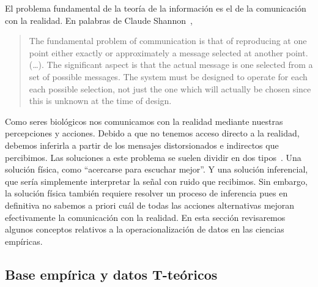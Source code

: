 \documentclass[a4paper,11pt]{book}
\theoremstyle{definition}
\begin{document}
El problema fundamental de la teor\'ia de la informaci\'on es el de la comunicaci\'on con la realidad.
%
En palabras de Claude Shannon~\cite{shannon1948-theoryOfCommunication},
%
\begin{quotation}
The fundamental problem of communication is that of reproducing at one point either exactly or approximately a message selected at another point.
(\dots).
The significant aspect is that the actual message is one selected from a set of possible messages.
The system must be designed to operate for each each possible selection, not just the one which will actually be chosen since this is unknown at the time of design.
\end{quotation}
%
Como seres biol\'ogicos nos comunicamos con la realidad mediante nuestras percepciones y acciones.
%
Debido a que no tenemos acceso directo a la realidad, debemos inferirla a partir de los mensajes distorsionados e indirectos que percibimos.
%
Las soluciones a este problema se suelen dividir en dos tipos~\cite{Mackay2003}.
%
Una soluci\'on f\'isica, como ``acercarse para escuchar mejor''.
%
Y una soluci\'on inferencial, que ser\'ia simplemente interpretar la se\~nal con ruido que recibimos.
%
Sin embargo, la soluci\'on f\'isica tambi\'en requiere resolver un proceso de inferencia pues en definitiva no sabemos a priori cu\'al de todas las acciones alternativas mejoran efectivamente la comunicaci\'on con la realidad.
%
En esta secci\'on revisaremos algunos conceptos relativos a la operacionalizaci\'on de datos en las ciencias emp\'iricas.

\subsection{Base emp\'irica y datos T-te\'oricos}
\end{document}
